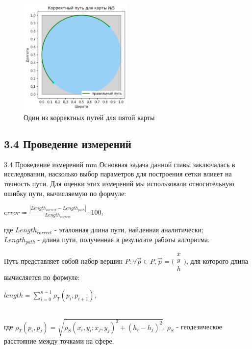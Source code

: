 \begin{enumerate}
{		\begin{figure}[H]
			\includegraphics[width=0.5\textwidth]{images/3_5.png}
			\caption{Один из корректных путей для пятой карты}
			\label{pic:correct_fifth}
		\end{figure}
	\vspace{2mm}
		}
\end{enumerate}

\par
\subsection*{\Large{3.4 Проведение измерений}}
 {3.4 Проведение измерений}
 mm
Основная задача данной главы заключалась в исследовании, насколько выбор параметров для построения сетки влияет на точность пути. Для оценки этих измерений мы использовали относительную ошибку пути, вычисляемую по формуле:\\
\centerline{$error = \frac{|Length_{correct} - Length_{path}|}{Length_{correct}} \cdot 100$,\\}
где $Length_{correct}$ - эталонная длина пути, найденная аналитически;\\
$Length_{path}$ - длина пути, полученная в результате работы алгоритма.

Путь представляет собой набор вершин $P: \forall \vec{p} \in P, \vec{p} = 
\bigl(\begin{smallmatrix}
x\\ 
y\\ 
h
\end{smallmatrix}\bigr)$, для которого длина вычисляется по формуле:\\
\centerline{$length =  \sum_{i = 0}^{n - 1}\rho_T(p_i, p_{i+1})$,} \\
где $\rho_T(p_i, p_j) = \sqrt{\rho_S(x_i, y_i; x_j, y_j)^2 + (h_i - h_j)^2}$,
$\rho_S$ - геодезическое расстояние между точками на сфере. 

